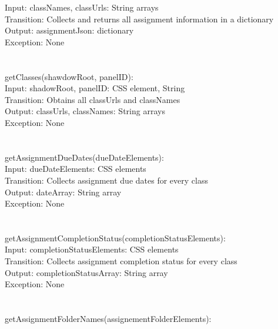 \documentclass[12pt, titlepage]{article}
\begin{document}
    Input: classNames, classUrls: String arrays\\

    Transition: Collects and returns all assignment information in a dictionary\\

    Output: assignmentJson: dictionary\\

    Exception: None\\
\\
\\
getClasses(shawdowRoot, panelID):\\

    Input: shadowRoot, panelID: CSS element, String\\

    Transition: Obtains all classUrls and classNames\\

    Output: classUrls, classNames: String arrays\\

    Exception: None\\
\\
\\
getAssignmentDueDates(dueDateElements):\\

    Input: dueDateElements: CSS elements\\

    Transition: Collects assignment due dates for every class\\

    Output: dateArray: String array\\

    Exception: None\\
\\
\\
getAssignmentCompletionStatus(completionStatusElements):\\

    Input: completionStatusElements: CSS elements\\

    Transition: Collects assignment completion status for every class\\

    Output: completionStatusArray: String array\\

    Exception: None\\
\\
\\
getAssignmentFolderNames(assignementFolderElements):\\
\end{document}
